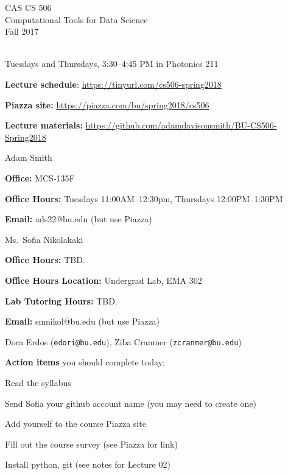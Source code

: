 \documentclass[11pt]{article}
\begin{document}
\sloppy 
\begin{center}
\LARGE CAS CS 506\\
\Large Computational Tools for Data Science\\
\Large\rm Fall 2017\\~\\
\end{center}

 Tuesdays and Thursdays, 3:30--4:45
PM in Photonics 211

\noindent \textbf{Lecture schedule}: 
\url{https://tinyurl.com/cs506-spring2018}

\noindent \textbf{Piazza site:} \url{https://piazza.com/bu/spring2018/cs506}

\noindent \textbf{Lecture materials:} \url{https://github.com/adamdavisonsmith/BU-CS506-Spring2018}


 Adam Smith
  \begin{compactitem}
  \item {\bf Office:} MCS-135F
  \item {\bf Office Hours:} {\small Tuesdays 11:00AM--12:30pm, Thursdays
      12:00PM--1:30PM}
  \item {\bf Email:} ads22@bu.edu (but use Piazza)
  \end{compactitem} 

\medskip


  Ms.\ Sofia Nikolakaki
 \begin{compactitem}
 \item {\bf Office Hours:} {\small TBD.}
 \item {\bf Office Hours Location:} Undergrad Lab, EMA 302
 \item {\bf Lab Tutoring Hours:} {\small TBD.}
 \item {\bf Email:} smnikol@bu.edu (but use Piazza)
 \end{compactitem}

 Dora Erdos (\texttt{edori@bu.edu}), Ziba
Cranmer (\texttt{zcranmer@bu.edu})

\medskip


\noindent \textbf{Action items} you should complete today:
\begin{compactitem}
\item Read the syllabus
\item Send Sofia your github account name (you may need to create one)
\item Add yourself to the course Piazza site
\item Fill out the course survey (see Piazza for link)
\item Install python, git (see notes for Lecture 02)
\end{compactitem}
\end{document}
